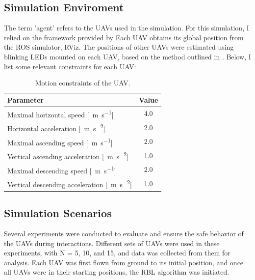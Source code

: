         \subsection{Simulation Enviroment}
            The term 'agent' refers to the UAVs used in the simulation.
            For this simulation, I relied on the framework provided by \cite{mrs_uav_system}
            Each UAV obtains its global position from the ROS simulator, RViz.
            The positions of other UAVs were estimated using blinking LEDs mounted on each UAV, based on the method outlined in \cite{uvdd1}.
            Below, I list some relevant constraints for each UAV:
            \begin{table}[h]
                \centering
                \renewcommand{\arraystretch}{1.1}
                \begin{tabular}{|l|c|}
                    \hline
                    \textbf{Parameter} & \textbf{Value} \\ \hline
                        Maximal horizontal speed [\SI{}{\meter\per\second}] & 4.0 \\ \hline
                        Horizontal acceleration [\SI{}{\meter\per\second\squared}] & 2.0 \\ \hline
                        Maximal ascending speed [\SI{}{\meter\per\second}] & 2.0 \\ \hline
                        Vertical ascending acceleration [\SI{}{\meter\per\second\squared}] & 1.0 \\ \hline
                        Maximal descending speed [\SI{}{\meter\per\second}] & 2.0 \\ \hline
                        Vertical descending acceleration [\SI{}{\meter\per\second\squared}] & 1.0 \\ \hline
                    \end{tabular}
                    \caption{Motion constraints of the UAV.}
                \label{tab:uav_constraints}
            \end{table}
        \subsection{Simulation Scenarios}
            Several experiments were conducted to evaluate and ensure the safe behavior of the UAVs during interactions. 
            Different sets of UAVs were used in these experiments, with N = 5, 10, and 15, and data was collected from them for analysis. 
            Each UAV was first flown from ground to its initial position, and once all UAVs were in their starting positions, the RBL algorithm was initiated.

